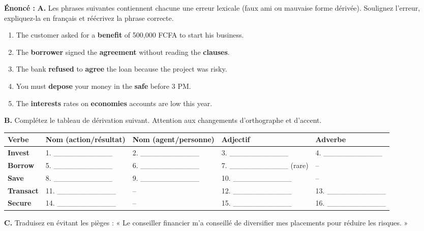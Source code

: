 \documentclass[11pt]{article}
\begin{document}
\begin{exoresolu}
    \textbf{Énoncé :}
    \textbf{A.} Les phrases suivantes contiennent chacune une erreur lexicale (faux ami ou mauvaise forme dérivée). Soulignez l'erreur, expliquez-la en français et réécrivez la phrase correcte.
    \begin{enumerate}
        \item The customer asked for a \textbf{benefit} of 500,000 FCFA to start his business.
        \item The \textbf{borrower} signed the \textbf{agreement} without reading the \textbf{clauses}.
        \item The bank \textbf{refused} to \textbf{agree} the loan because the project was risky.
        \item You must \textbf{depose} your money in the \textbf{safe} before 3 PM.
        \item The \textbf{interests} rates on \textbf{economies} accounts are low this year.
    \end{enumerate}
    \textbf{B.} Complétez le tableau de dérivation suivant. Attention aux changements d'orthographe et d'accent.
    \begin{center}
        \begin{tabular}{|l|l|l|l|l|}\hline 
        \rowcolor{popblueL} \textbf{Verbe} & \textbf{Nom (action/résultat)} & \textbf{Nom (agent/personne)} & \textbf{Adjectif} & \textbf{Adverbe} \\ \hline
        \textbf{Invest} & 1. \_\_\_\_\_\_\_\_\_\_\_ & 2. \_\_\_\_\_\_\_\_\_\_\_ & 3. \_\_\_\_\_\_\_\_\_\_\_ & 4. \_\_\_\_\_\_\_\_\_\_\_ \\ \hline
        \textbf{Borrow} & 5. \_\_\_\_\_\_\_\_\_\_\_ & 6. \_\_\_\_\_\_\_\_\_\_\_ & 7. \_\_\_\_\_\_\_\_\_\_\_ (rare) & -- \\ \hline
        \textbf{Save} & 8. \_\_\_\_\_\_\_\_\_\_\_ & 9. \_\_\_\_\_\_\_\_\_\_\_ & 10. \_\_\_\_\_\_\_\_\_\_\_ & -- \\ \hline
        \textbf{Transact} & 11. \_\_\_\_\_\_\_\_\_\_\_ & -- & 12. \_\_\_\_\_\_\_\_\_\_\_ & 13. \_\_\_\_\_\_\_\_\_\_\_ \\ \hline
        \textbf{Secure} & 14. \_\_\_\_\_\_\_\_\_\_\_ & -- & 15. \_\_\_\_\_\_\_\_\_\_\_ & 16. \_\_\_\_\_\_\_\_\_\_\_ \\ \hline
    \end{tabular}
    \end{center}
    \textbf{C.} Traduisez en évitant les pièges : « Le conseiller financier m'a conseillé de diversifier mes placements pour réduire les risques. »
    

\end{exoresolu}
\end{document}
